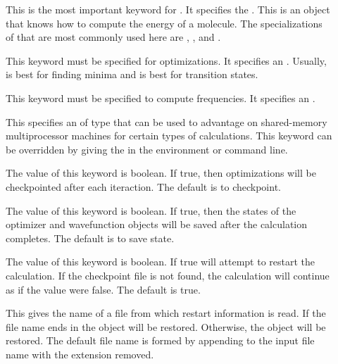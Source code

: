 \begin{description}
\item[] This is the most important keyword for .
        It specifies the 
        .  This is an object that knows how to
        compute the energy of a molecule.  The specializations of
         that are most commonly used here are
        , , and .
\item[] This keyword must be specified for optimizations.  It
        specifies an  .
        Usually,  is best for finding minima and
         is best for transition states.
\item[] This keyword must be specified to compute frequencies.
        It specifies an 
        .
\item[] This specifies an  of type
         that can be used to advantage on shared-memory
        multiprocessor machines for certain types of calculations.  This
        keyword can be overridden by giving the  in the
        environment or command line.
\item[] The value of this keyword is boolean.  If true,
        then optimizations will be checkpointed after each iteraction.  The
        default is to checkpoint.
\item[] The value of this keyword is boolean.  If true,
        then the states of the optimizer and wavefunction objects will be
        saved after the calculation completes.  The default is to save
        state.
\item[] The value of this keyword is boolean.  If true
         will attempt to restart the calculation.  If the
        checkpoint file is not found, the calculation will continue as if
        the value were false. The default is true.
\item[] This gives the name of a file from which
        restart information is read.  If the file name ends in
         the  object will be restored.  Otherwise,
        the  object will be restored.  The default file name
        is formed by appending  to the input file name
        with the extension removed.

\end{description}
